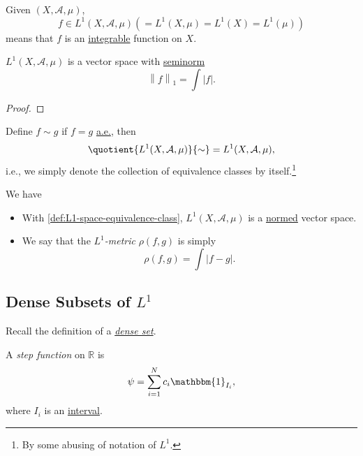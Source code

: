 \begin{definition}[\(L^1\) Space]\label{def:L1-space}
	Given \((X, \mathcal{A} , \mu )\),
	\[
		f\in L^1(X, \mathcal{A} , \mu )\left( = L^1(X, \mu ) = L^1(X) = L^1(\mu )\right)
	\]
	means that \(f\) is an \hyperref[def:integrable]{integrable} function on \(X\).
\end{definition}

\begin{lemma}
	\(L^1(X, \mathcal{A} , \mu )\) is a vector space with \hyperref[def:seminorm]{seminorm}
	\[
		\left\lVert f\right\rVert _1 = \int \left\vert f \right\vert .
	\]
\end{lemma}
\begin{proof}
\end{proof}

\begin{definition}\label{def:L1-space-equivalence-class}
	Define \(f\sim g\) if \(f = g\) \hyperref[def:mu-almost-everywhere]{a.e.}, then
	\[
		\quotient{L^1(X, \mathcal{A} , \mu )}{\sim} = L^1(X, \mathcal{A} , \mu ),
	\]
	i.e., we simply denote the collection of equivalence classes by itself.\footnote{By some abusing of notation of \(L^1\).}
\end{definition}
\begin{remark}
	We have
	\begin{itemize}
		\item With \autoref{def:L1-space-equivalence-class}, \(L^1(X, \mathcal{A} , \mu )\) is a \hyperref[def:norm]{normed} vector space.
		\item \label{def:L-1-metric} We say that the \emph{\(L^1\)-metric} \(\rho (f, g)\) is simply
		      \[
			      \rho (f, g) = \int \left\vert f - g \right\vert.
		      \]
	\end{itemize}
\end{remark}

\subsection{Dense Subsets of \(L^1\)}
\begin{prev}
	Recall the definition of a \href{https://en.wikipedia.org/wiki/Dense_set}{\emph{dense set}}.
\end{prev}

\begin{definition}\label{def:step-function}
	A \emph{step function} on \(\mathbb{R} \) is
	\[
		\psi = \sum_{i=1}^{N} c_{i}\mathbbm{1}_{I_{i}},
	\]
	where \(I_{i}\) is an \underline{interval}.
\end{definition}

